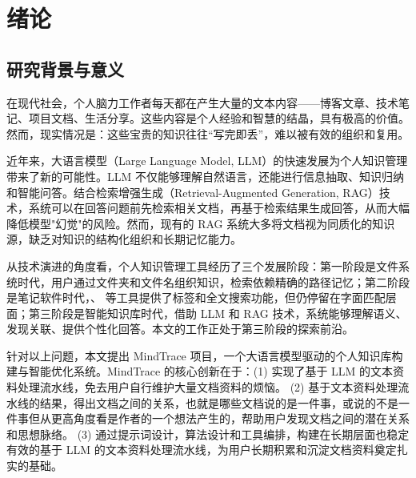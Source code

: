 

\renewcommand{\lstlistingname}{代码}

\section{绪论}
\subsection{研究背景与意义}

在现代社会，个人脑力工作者每天都在产生大量的文本内容——博客文章、技术笔记、项目文档、生活分享。这些内容是个人经验和智慧的结晶，具有极高的价值。然而，现实情况是：这些宝贵的知识往往“写完即丢”，难以被有效的组织和复用。

近年来，大语言模型（Large Language Model, LLM）的快速发展为个人知识管理带来了新的可能性\cite{vaswani2017attention,brown2020language}。LLM 不仅能够理解自然语言，还能进行信息抽取、知识归纳和智能问答。结合检索增强生成（Retrieval-Augmented Generation, RAG）技术，系统可以在回答问题前先检索相关文档，再基于检索结果生成回答，从而大幅降低模型"幻觉"\cite{ji2023hallucination}的风险。然而，现有的 RAG 系统大多将文档视为同质化的知识源，缺乏对知识的结构化组织和长期记忆能力。

从技术演进的角度看，个人知识管理工具经历了三个发展阶段：第一阶段是文件系统时代，用户通过文件夹和文件名组织知识，检索依赖精确的路径记忆；第二阶段是笔记软件时代，、 等工具提供了标签和全文搜索功能，但仍停留在字面匹配层面；第三阶段是智能知识库时代，借助 LLM 和 RAG 技术，系统能够理解语义、发现关联、提供个性化回答。本文的工作正处于第三阶段的探索前沿。

针对以上问题，本文提出 MindTrace 项目，一个大语言模型驱动的个人知识库构建与智能优化系统。MindTrace 的核心创新在于：(1) 实现了基于 LLM 的文本资料处理流水线，免去用户自行维护大量文档资料的烦恼。 (2) 基于文本资料处理流水线的结果，得出文档之间的关系，也就是哪些文档说的是一件事，或说的不是一件事但从更高角度看是作者的一个想法产生的，帮助用户发现文档之间的潜在关系和思想脉络。 (3) 通过提示词设计，算法设计和工具编排，构建在长期层面也稳定有效的基于 LLM 的文本资料处理流水线，为用户长期积累和沉淀文档资料奠定扎实的基础。

